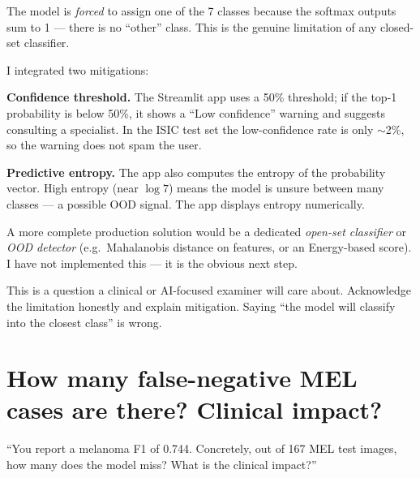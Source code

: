 \documentclass[11pt,a4paper]{article}
\begin{document}
\begin{answer}
The model is \textit{forced} to assign one of the 7 classes because the softmax outputs sum to 1 --- there is no ``other'' class. This is the genuine limitation of any closed-set classifier.

I integrated two mitigations:

\textbf{Confidence threshold.} The Streamlit app uses a 50\% threshold; if the top-1 probability is below 50\%, it shows a ``Low confidence'' warning and suggests consulting a specialist. In the ISIC test set the low-confidence rate is only $\sim$2\%, so the warning does not spam the user.

\textbf{Predictive entropy.} The app also computes the entropy of the probability vector. High entropy (near $\log 7$) means the model is unsure between many classes --- a possible OOD signal. The app displays entropy numerically.

A more complete production solution would be a dedicated \textit{open-set classifier} or \textit{OOD detector} (e.g.\ Mahalanobis distance on features, or an Energy-based score). I have not implemented this --- it is the obvious next step.
\end{answer}

\begin{tip}
This is a question a clinical or AI-focused examiner will care about. Acknowledge the limitation honestly and explain mitigation. Saying ``the model will classify into the closest class'' is wrong.
\end{tip}

\section{How many false-negative MEL cases are there? Clinical impact?}

\begin{question}
``You report a melanoma F1 of 0.744. Concretely, out of 167 MEL test images, how many does the model miss? What is the clinical impact?''
\end{question}
\end{document}
